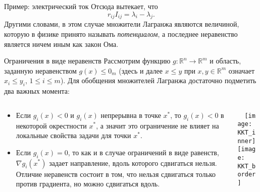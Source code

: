 \documentclass[10pt]{beamer}
\begin{document}
\begin{frame}{Пример: электрический ток}
Отсюда вытекает, что
$$
r_{ij}I_{ij}=\lambda_i-\lambda_j.
$$
Другими словами, в этом случае множители Лагранжа являются величиной, которую в физике принято называть \textit{потенциалом}, а последнее неравенство является ничем иным как закон Ома.
\end{frame}


\begin{frame}{Ограничения в виде неравенств}
Рассмотрим функцию $g:\mathbb{R}^n\rightarrow \mathbb{R}^m$ и область, заданную неравенством $g(x)\leq 0_m$ (здесь и далее $x\leq y$ при $x, y\in\mathbb{R}^m$ означает $x_i\leq y_i$, $1\leq i\leq m$). Для обобщения множителей Лагранжа достаточно подметить два важных момента:
\begin{columns}
\begin{column}{.65\textwidth}
\begin{itemize}
\item Если $g_i(x)<0$ и $g_i(x)$ непрерывна в точке $x^*$, то $g_i(x)<0$ в некоторой окрестности $x^*$, а значит это ограничение не влияет на локальные свойства задачи для точки $x^*$.
\item Если $g_i(x)=0$, то как и в случае ограничений в виде равенств, $\nabla g_i(x^*)$ задает направление, вдоль которого сдвигаться нельзя. Отличие неравенств состоит в том, что нельзя сдвигаться только против градиента, но можно сдвигаться вдоль.
\end{itemize}
\end{column}
\begin{column}{.35\textwidth}
~~\texttt{[image: KKT\_inner]}\\
\texttt{[image: KKT\_border]}
\end{column}
\end{columns}
\end{frame}
\end{document}
